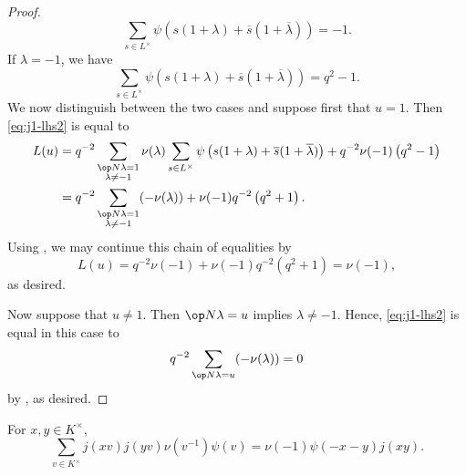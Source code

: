 \documentclass[../main.tex]{subfiles}
\begin{document}
\begin{proof}
	\[\sum_{s\in L^\times}\psi\left(s(1+\lambda)+\overline s(1+\overline\lambda)\right)=-1.\]
	If $\lambda=-1$, we have
	\[\sum_{s\in L^\times}\psi\left(s(1+\lambda)+\overline s(1+\overline\lambda)\right)=q^2-1.\]
	We now distinguish between the two cases and suppose first that $u=1$. Then \eqref{eq:j1-lhs2} is equal to
	\begin{align}
		L(u) &= q^{-2}\sum_{\substack{\op N\lambda=1\\\lambda\ne-1}}\nu(\lambda)\sum_{s\in L^\times}\psi\left(s(1+\lambda)+\overline s(1+\overline\lambda)\right)+q^{-2}\nu(-1)\left(q^2-1\right) \\
		&= q^{-2}\sum_{\substack{\op N\lambda=1\\\lambda\ne-1}}(-\nu(\lambda))+\nu(-1)q^{-2}\left(q^2+1\right).
	\end{align}
	Using , we may continue this chain of equalities by
	\[L(u)=q^{-2}\nu(-1)+\nu(-1)q^{-2}\left(q^2+1\right)=\nu(-1),\]
	as desired.

	Now suppose that $u\ne1$. Then $\op N\lambda=u$ implies $\lambda\ne-1$. Hence, \eqref{eq:j1-lhs2} is equal in this case to
	\[q^{-2}\sum_{\op N\lambda=u}(-\nu(\lambda))=0\]
	by , as desired.
\end{proof}
\begin{lemma} \label{lem:j2}
	For $x,y\in K^\times$,
	\[\sum_{v\in K^\times}j(xv)j(yv)\nu\left(v^{-1}\right)\psi(v)=\nu(-1)\psi(-x-y)j(xy).\]
\end{lemma}
\end{document}
